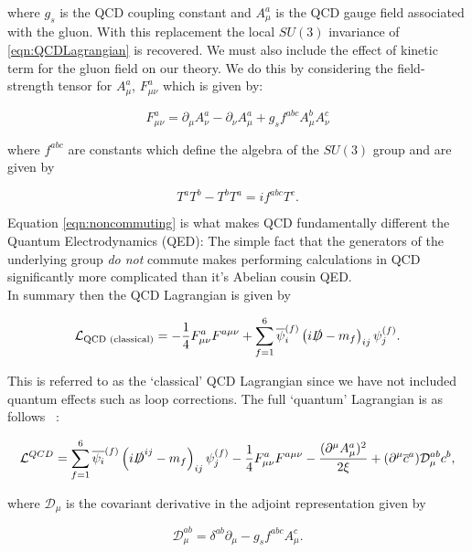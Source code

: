 	\noindent where $g_s$ is the QCD coupling constant and $A_\mu^a$ is the QCD gauge field associated with the gluon.
	With this replacement the local $SU(3)$ invariance of \eqref{eqn:QCDLagrangian} is recovered.  We must also include
	the effect of kinetic term for the gluon field on our theory.  We do this by considering the field-strength tensor for $A^a_\mu$,
	$F^a_{\mu\nu}$ which is given by:

	\begin{equation}
		F^a_{\mu\nu} = \partial_\mu A^a_\nu - \partial_\nu A^a_\mu + g_sf^{abc}A_\mu^bA_\nu^c
	\end{equation}

	\noindent where $f^{abc}$ are constants which define the algebra of the $SU(3)$ group and are given by

	\begin{equation}
		T^aT^b -T^bT^a = if^{abc}T^c.
		\label{eqn:noncommuting}
	\end{equation}

	Equation \eqref{eqn:noncommuting} is what makes QCD fundamentally different the Quantum Electrodynamics (QED):  The simple
	fact that the generators of the underlying group \emph{do not} commute makes performing calculations in QCD
	significantly more complicated than it's Abelian cousin QED.\\
	In summary then the QCD Lagrangian is given by

	\begin{equation}
		\mathcal{L}_{\text{QCD (classical)}} = -\frac{1}{4}F_{\mu\nu}^aF^{a\mu\nu} + \sum_{f=1}^{6}\overline{\psi}_i^{(f)}\left(i\slashed D- m_f\right)_{ij}\psi_j^{(f)}.
	\end{equation}

	This is referred to as the `classical' QCD Lagrangian since we have not included quantum effects such as
	loop corrections.  The full `quantum' Lagrangian is as follows ~\cite{muta}:

	\begin{equation}
		\mathcal{L}^{QCD}=\sum_{f=1}^{6}\overline{\psi_{i}}^{(f)}\left(i\slashed D^{ij}-m_f\right)_{ij}\psi_{j}^{(f)} -
			\frac{1}{4}F^a_{\mu\nu}F^{a\mu\nu} - \frac{(\partial^\mu A_{\mu}^a)^2}{2\xi} +
			(\partial^\mu \overline{c}^{a})\mathcal{D}_{\mu}^{ab}c^b,
			\label{eqn:fullQCD}
	\end{equation}

	where $\mathcal{D}_{\mu}$ is the covariant derivative in the adjoint representation given by

	\begin{equation}
		\mathcal{D}_\mu^{ab} = \delta^{ab}\partial_\mu - g_sf^{abc}A^c_\mu.
	\end{equation}


